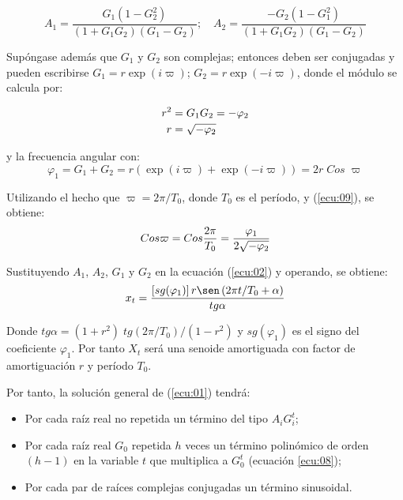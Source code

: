 \[
A_{1} =\frac{G_{1} \left( {1-G_{2}^{2} } \right)}{\left( {1+G_{1} G_{2} } \right)\left( {G_{1} -G_{2} } \right)};\quad A_{2} =\frac{-G_{2} \left( {1-G_{1}^{2} } \right)}{\left( {1+G_{1} G_{2} } \right)\left( {G_{1} -G_{2} } \right)}
\]

Sup\'{o}ngase adem\'{a}s que $G_{1}$ y $G_{2}$ son complejas; entonces deben ser conjugadas y pueden escribirse $G_{1} =r\exp \left(i\varpi \right)$; $G_{2} =r \exp \left(-i\varpi \right)$, donde el m\'{o}dulo se calcula por:

\begin{equation}{
\label{ecu:09}
\begin{split}
r^{2} &= G_{1} G_{2} =-\varphi_{2}\\
r&=\sqrt{-\varphi_{2}}
\end{split}
}
\end{equation}

y la frecuencia angular con:
\[
\varphi_{1} =G_{1} +G_{2} =r\left( {\exp \left( {i\varpi } \right)+\exp \left( {-i\varpi } \right)} \right)=2r\;Cos\;\varpi 
\]

Utilizando el hecho que $\varpi =2\pi /T_{0}$, donde $T_{0}$ es el per\'{i}odo, y (\ref{ecu:09}), se obtiene:
\begin{equation}{
\label{ecu:10}
Cos \varpi = Cos\frac{2\pi}{T_{0}}=\frac{\varphi_{1}}{2\sqrt{-\varphi_{2}}} }
\end{equation}

Sustituyendo $A_{1}$, $A_{2}$, $G_{1}$ y $G_{2}$ en la ecuaci\'{o}n (\ref{ecu:02}) y operando, se obtiene:
\[
x_{t} =\frac{\left[sg(\varphi_{1}) \right]r \sen\left(2\pi t/T_{0} +\alpha \right)}{tg\alpha }
\]

Donde $tg \alpha =\left(1+r^{2} \right)\;tg\left(2\pi /T_{0} \right)/\left( {1-r^{2}} \right)$ y $sg\left(\varphi_{1} 
\right)$ es el signo del coeficiente $\varphi_{1}$. Por tanto $X_{t}$ ser\'{a} una senoide amortiguada con factor de amortiguaci\'{o}n $r$ y per\'{i}odo $T_{0}$.\newline

Por tanto, la soluci\'{o}n general de (\ref{ecu:01}) tendr\'{a}: 

\begin{itemize}
\item Por cada ra\'{i}z real no repetida un t\'{e}rmino del tipo $A_{i} G_{i}^{t}$; 
\item Por cada ra\'{i}z real $G_{0}$ repetida $h$ veces un t\'{e}rmino polin\'{o}mico de orden $\left(h-1\right)$ en la variable $t$ que multiplica a $G_{0}^{t} $ (ecuaci\'{o}n \ref{ecu:08});
\item Por cada par de ra\'{i}ces complejas conjugadas un t\'{e}rmino sinusoidal.
\end{itemize}


